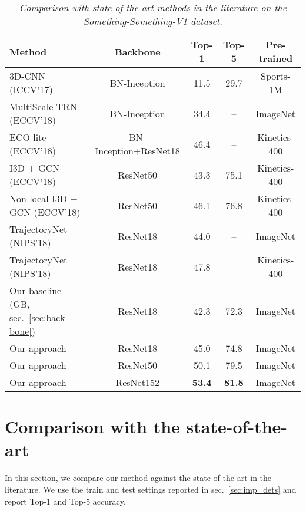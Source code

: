 \documentclass[10pt,twocolumn,letterpaper]{article}
\begin{document}
\begin{table*}
\begin{center}
\begin{tabular}{|l|c|c|c|c|}
\hline
Method & Backbone & Top-1 & Top-5 & Pre-trained \\
\hline
3D-CNN \cite{Something_Something_ICCV17} (ICCV'17) & BN-Inception & 11.5 & 29.7 & Sports-1M  \\
MultiScale TRN \cite{TemporalRelationalReasoning_ECCV18} (ECCV'18) & BN-Inception & 34.4 & -- & ImageNet \\
ECO lite \cite{Eco_ECCV18} (ECCV'18) & BN-Inception+ResNet18 &  46.4 & -- & Kinetics-400 \\
I3D + GCN \cite{SpaceTimeGraphs_ECCV18} (ECCV'18) & ResNet50 & 43.3 & 75.1 & Kinetics-400 \\
Non-local I3D + GCN \cite{SpaceTimeGraphs_ECCV18} (ECCV'18) & ResNet50 & 46.1 & 76.8 & Kinetics-400 \\
TrajectoryNet \cite{Trajectory_NIPS18} (NIPS'18) & ResNet18 & 44.0 & -- & ImageNet \\
TrajectoryNet \cite{Trajectory_NIPS18} (NIPS'18) & ResNet18 & 47.8 & -- & Kinetics-400 \\
\hline
Our baseline (GB, sec.~\ref{sec:back-bone}) & ResNet18 & 42.3  & 72.3 & ImageNet \\
Our approach & ResNet18 & 45.0 & 74.8 & ImageNet \\
Our approach & ResNet50 & 50.1 & 79.5 & ImageNet  \\
\cellcolor[gray]{0.9}Our approach & \cellcolor[gray]{0.9} ResNet152 & \cellcolor[gray]{0.9}\bf 53.4 & \cellcolor[gray]{0.9}\bf 81.8 & \cellcolor[gray]{0.9}ImageNet \\
\hline
\end{tabular}
\vspace{-2mm}
\end{center}
\caption{\it Comparison with state-of-the-art methods in the literature on the Something-Something-V1 dataset.\vspace{-5mm}}
\label{tab:sota_something_something}
\end{table*}


\section{Comparison with the state-of-the-art} \label{sec:exp:sota}
In this section, we compare our method against the state-of-the-art in the literature. We use the train and test settings reported in sec.~\ref{sec:imp_dets} and report Top-1 and Top-5 accuracy.
\end{document}
